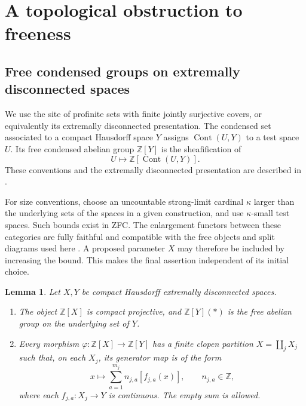 \documentclass[11pt]{article}
\newtheorem{lemma}[theorem]{Lemma}
\theoremstyle{definition}
\theoremstyle{remark}
\newcommand{\Z}{\mathbb Z}
\begin{document}
\tableofcontents
\section{A topological obstruction to freeness}
\label{sec:transfer}

\subsection{Free condensed groups on extremally disconnected spaces}

We use the site of profinite sets with finite jointly surjective
covers, or equivalently its extremally disconnected presentation.
The condensed set associated to a compact Hausdorff space $Y$ assigns
$\operatorname{Cont}(U,Y)$ to a test space $U$. Its free condensed
abelian group $\Z[Y]$ is the sheafification of
\[
 U\longmapsto\Z[\operatorname{Cont}(U,Y)].
\]
These conventions and the extremally disconnected presentation are
described in \cite[Theorem~2.2 and Proposition~2.7]{ScholzeCondensed}.

For size conventions, choose an uncountable strong-limit cardinal
$\kappa$ larger than the underlying sets of the spaces in a given
construction, and use $\kappa$-small test spaces. Such bounds exist in
ZFC. The enlargement functors between these categories are fully
faithful and compatible with the free objects and split diagrams used
here \cite[Proposition~2.9, Remark~2.10, Definition~2.11, and
Remark~2.13]{ScholzeCondensed}. A proposed parameter $X$ may therefore
be included by increasing the bound. This makes the final assertion
independent of its initial choice.

\begin{lemma}
\label{lem:finite-branches}
Let $X,Y$ be compact Hausdorff extremally disconnected spaces.
\begin{enumerate}
\item The object $\Z[X]$ is compact projective, and $\Z[Y](*)$ is the
free abelian group on the underlying set of $Y$.
\item Every morphism $\varphi:\Z[X]\to\Z[Y]$ has a finite clopen
partition $X=\coprod_j X_j$ such that, on each $X_j$, its generator
map is of the form
\[
 x\longmapsto\sum_{a=1}^{m_j}n_{j,a}[f_{j,a}(x)],
 \qquad n_{j,a}\in\Z,
\]
where each $f_{j,a}:X_j\to Y$ is continuous. The empty sum is allowed.
\end{enumerate}
\end{lemma}
\end{document}
